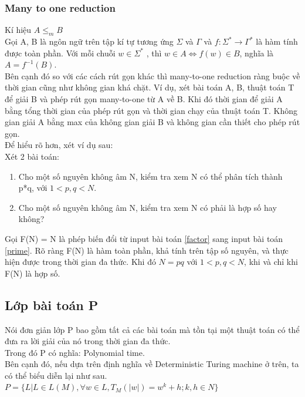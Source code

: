 \documentclass[a4paper 14pt]{article}
\begin{document}
			\subsubsection{Many to one reduction}
				Kí hiệu $A \leq_m B$\\
				Gọi A, B là ngôn ngữ trên tập kí tự tương ứng $\Sigma$ và $\Gamma$ và $f: \Sigma^* \to \Gamma^*$ là hàm tính được toàn phần. Với mỗi chuỗi $w \in \Sigma^*$ , thì $w \in A \Leftrightarrow f(w) \in B$, nghĩa là $A = f^{-1}(B)$.\\
				Bên cạnh đó so với các cách rút gọn khác thì many-to-one reduction ràng buộc về thời gian cũng như không gian khá chặt. Ví dụ, xét bài toán A, B, thuật toán T để giải B và phép rút gọn many-to-one từ A về B. Khi đó thời gian để giải A bằng tổng thời gian của phép rút gọn và thời gian chạy của thuật toán T. Không gian giải A bằng max của không gian giải B và không gian cần thiết cho phép rút gọn.\\
				Để hiểu rõ hơn, xét ví dụ sau:\\
				Xét 2 bài toán:
				\begin{enumerate}
					\item\label{factor} Cho một số nguyên không âm N, kiểm tra xem N có thể phân tích thành p*q, với $1 < p,q < N$.
					\item\label{prime} Cho một số nguyên không âm N, kiểm tra xem N có phải là hợp số hay không?
				\end{enumerate}
				Gọi F(N) = N là phép biến đổi từ input bài toán \ref{factor} sang input bài toán \ref{prime}. Rõ ràng F(N) là hàm toàn phần, khả tính trên tập số nguyên, và thực hiện được trong thời gian đa thức. Khi đó $N = pq$ với $1 < p,q < N$, khi và chỉ khi F(N) là hợp số.
		\subsection{Lớp bài toán P}
			Nói đơn giản lớp P bao gồm tất cả các bài toán mà tồn tại một thuật toán có thể đưa ra lời giải của nó trong thời gian đa thức.\\
			Trong đó P có nghĩa: Polynomial time.\\
			Bên cạnh đó, nếu dựa trên định nghĩa về Deterministic Turing machine ở trên, ta có thể biểu diễn lại như sau.
			$P = \{L| L \in L(M), \forall w \in L, T_M(|w|) = w^k + h; k,h \in N\}$\\		
			
\end{document}
